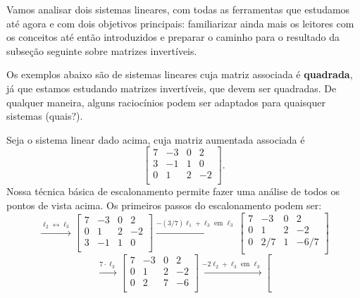 \documentclass[../livro.tex]{subfiles}  %
\begin{document}
Vamos analisar dois sistemas lineares, com todas as ferramentas que estudamos até agora e com dois objetivos principais: familiarizar ainda mais os leitores com os conceitos até então introduzidos e preparar o caminho para o resultado da subseção seguinte sobre matrizes invertíveis.

Os exemplos abaixo são de sistemas lineares cuja matriz associada é \textbf{quadrada}, já que estamos estudando matrizes invertíveis, que devem ser quadradas. De qualquer maneira, alguns raciocínios podem ser adaptados para quaisquer sistemas (quais?).

\begin{example}
	Seja o sistema linear dado acima, cuja matriz aumentada associada é
	\begin{equation}
	\left[
	\begin{array}{ccc|c}
	7 & -3 & 0 & 2 \\
	3 & -1 & 1 & 0 \\
	0 & 1 & 2 & -2 \\
	\end{array}
	\right].
	\end{equation} Nossa técnica básica de escalonamento permite fazer uma análise de todos os pontos de vista acima. Os primeiros passos do escalonamento podem ser:
	\begin{equation}
	\xrightarrow{\ell_2 \leftrightarrow \ell_3}
	\left[
	\begin{array}{ccc|c}
	7 & -3 & 0 & 2 \\
	0 & 1 & 2 & -2 \\
	3 & -1 & 1 & 0 \\
	\end{array}
	\right]\xrightarrow{-(3/7)\ell_1 + \ell_3 \text{ em } \ell_3}
	\left[
	\begin{array}{ccc|c}
	7 & -3 & 0 & 2 \\
	0 & 1 & 2 & -2 \\
	0 & 2/7 & 1 & -6/7 \\
	\end{array}
	\right]
	\end{equation}
	\begin{equation}
	\xrightarrow{7 \cdot \ell_3}
	\left[
	\begin{array}{ccc|c}
	7 & -3 & 0 & 2 \\
	0 & 1 & 2 & -2 \\
	0 & 2 & 7 & -6 \\
	\end{array}
	\right] \xrightarrow{-2\ell_2 + \ell_3 \text{ em } \ell_3}
	\left[

\end{equation}
\end{example}
\end{document}
